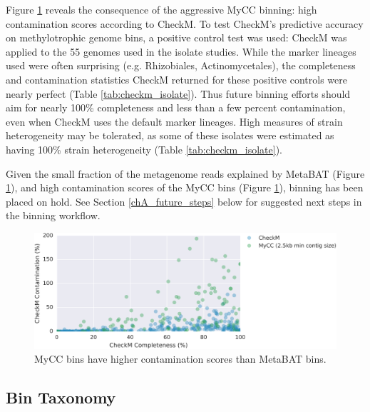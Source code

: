 Figure \ref{fig:mycc_contamination} reveals the consequence of the aggressive MyCC binning: high contamination scores according to CheckM.
To test CheckM's predictive accuracy on methylotrophic genome bins, a positive control test was used: CheckM was applied to the 55 genomes used in the isolate studies.
While the marker lineages used were often surprising (e.g. Rhizobiales, Actinomycetales), the completeness and contamination statistics CheckM returned for these positive controls were nearly perfect (Table \ref{tab:checkm_isolate}).
Thus future binning efforts should aim for nearly 100\% completeness and less than a few percent contamination, even when CheckM uses the default marker lineages.
High measures of strain heterogeneity may be tolerated, as some of these isolates were estimated as having 100\% strain heterogeneity  (Table \ref{tab:checkm_isolate}).

Given the small fraction of the metagenome reads explained by MetaBAT (Figure \ref{fig:mycc_contamination}), and high contamination scores of the MyCC bins (Figure \ref{fig:mycc_contamination}), binning has been placed on hold.
See Section \ref{chA_future_steps} below for suggested next steps in the binning workflow.


\begin{figure}[H]
\centering
    \includegraphics[width=1.0\textwidth]{./tex/chapter2/figures/170202_MyCC_has_higher_contamination--cleaned.pdf}
    \begin{singlespace}
    \caption[MyCC bins have higher contamination scores than MetaBAT bins]{
        MyCC bins have higher contamination scores than MetaBAT bins.}
    \label{fig:mycc_contamination}
    \end{singlespace}
\end{figure}

\subsection{Bin Taxonomy}


